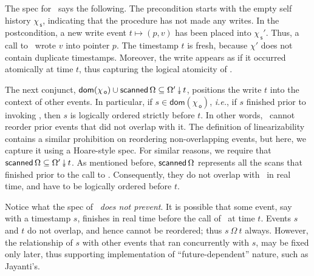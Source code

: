 \documentclass[a4paper,UKenglish]{lipics-v2016}
\newcommand{\ie}{\emph{i.e.}\xspace}
\newcommand{\dom}[1]{\mathsf{dom}(#1)}
\newcommand{\selfsub}{\mathsf{s}}
\newcommand{\othersub}{\mathsf{o}}
\newcommand{\hist}{\chi}
\newcommand{\histS}{\hist_{\, \selfsub}}
\newcommand{\histO}{\hist_{\, \othersub}}
\newcommand{\eqdef}{\mathrel{\:\widehat{=}\:}}
\newcommand{\stableorder}{\Omega}
\newcommand{\stableorderP}{\stableorder'}
\newcommand{\histP}{\chi'}
\theoremstyle{definition}
\begin{document}

The spec for \jywrite\ says the following. The precondition starts
with the empty self history $\histS$, indicating that the procedure
has not made any writes. In the postcondition, a new write event $t
\mapsto (p, v)$ has been placed into $\histS'$. Thus, a call to
\jywrite\ wrote $v$ into pointer $p$. The timestamp $t$
is fresh, because $\histP$ does not contain duplicate timestamps.
%
Moreover, the write appears as if it occurred atomically at time
$t$, thus capturing the logical atomicity of \jywrite.

The next conjunct, $\dom{\histO} \cup \scanned\stableorder \subseteq
\sideal{\stableorderP}{t}$, positions the write $t$ into the context
of other events. In particular, if $s \in \dom{\histO}$, \ie, if $s$
finished prior to invoking \jywrite, then $s$ is logically ordered
strictly before $t$. In other words, \jywrite\ cannot reorder prior
events that did not overlap with it. The definition of linearizability
contains a similar prohibition on reordering non-overlapping events,
but here, we capture it using a Hoare-style spec. For similar reasons,
we require that $\scanned\stableorder \subseteq
\sideal{\stableorderP}{t}$. As mentioned before,
$\scanned\stableorder$ represents all the scans that finished prior to
the call to \jywrite. Consequently, they do not overlap with
\jywrite\ in real time, and have to be logically ordered before $t$.

Notice what the spec of \jywrite\ \emph{does not prevent}. It is
possible that some event, say with a timestamp $s$, finishes in real
time before the call of \jywrite~at time $t$. Events $s$ and $t$ do
not overlap, and hence cannot be reordered; thus
$s\ {\stableorder}\ t$ always. However, the relationship of $s$ with
other events that ran concurrently with $s$, may be fixed only later,
thus supporting implementation of ``future-dependent'' nature, such as
Jayanti's.


\end{document}
